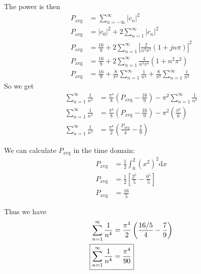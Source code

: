 \documentclass[twocolumn]{myarticle}
\renewcommand{\d}{\mathrm{d}}
\begin{document}
The power is then
\begin{align}
    P_\text{avg} &= \sum_{n = -\infty}^{\infty} \left| c_n \right|^2
    \\
    P_\text{avg} &= |c_0|^2 + 2 \sum_{n = 1}^{\infty} \left| c_n \right|^2
    \\
    P_\text{avg} &= \frac{16}{9} + 2 \sum_{n = 1}^{\infty} \left| \frac{2}{n^2 \pi^2} \left( 1 + j n \pi \right) \right|^2
    \\
    P_\text{avg} &= \frac{16}{9} + 2 \sum_{n = 1}^{\infty} \frac{4}{n^4 \pi^4} \left( 1 + n^2 \pi^2 \right)
    \\
    P_\text{avg} &= \frac{16}{9} + \frac{8}{\pi^4} \sum_{n = 1}^{\infty} \frac{1}{n^4} + \frac{8}{\pi^2} \sum_{n=1}^{\infty} \frac{1}{n^2}
\end{align}
So we get
\begin{align}
    \sum_{n=1}^{\infty} \frac{1}{n^4} &= \frac{\pi^4}{8} \left( P_\text{avg} - \frac{16}{9} \right) - \pi^2 \sum_{n=1}^{\infty} \frac{1}{n^2} 
    \\
    \sum_{n=1}^{\infty} \frac{1}{n^4} &= \frac{\pi^4}{8} \left( P_\text{avg} - \frac{16}{9} \right) - \pi^2 \left( \frac{\pi^2}{6} \right)
    \\
    \sum_{n=1}^{\infty} \frac{1}{n^4} &= \frac{\pi^4}{2} \left( \frac{P_\text{avg}}{4} - \frac{7}{9}\right)
\end{align}

We can calculate $ P_\text{avg} $ in the time domain:
\begin{align}
    P_\text{avg} &= \frac{1}{2} \int_0^2 \left( x^2 \right)^2 \d x
    \\
    P_\text{avg} &= \frac{1}{2} \left[ \frac{2^5}{5} - \frac{0^5}{5} \right]
    \\
    P_\text{avg} &= \frac{16}{5}
\end{align}

Thus we have
\begin{align}
    \sum_{n=1}^{\infty} \frac{1}{n^4} &= \frac{\pi^4}{2} \left( \frac{16/5}{4} - \frac{7}{9}\right)
    \\
    \Aboxed{\sum_{n=1}^{\infty} \frac{1}{n^4} &= \frac{\pi^4}{90}}
\end{align}
\end{document}
